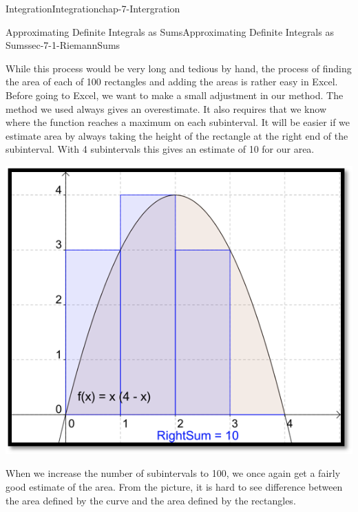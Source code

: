 \documentclass[oneside,10pt,]{book}
\numberwithin{equation}{section}
\begin{document}
\begin{chapterptx}{Integration}{}{Integration}{}{}{chap-7-Intergration}
\begin{sectionptx}{Approximating Definite Integrals as Sums}{}{Approximating Definite Integrals as Sums}{}{}{sec-7-1-RiemannSums}
\begin{sidebyside}{1}{0.2}{0.2}{0}
\begin{sbspanel}{0.6}
\end{sbspanel}%
\end{sidebyside}%
\par
\hypertarget{p-2554}{}%
While this process would be very long and tedious by hand, the process of finding the area of each of 100 rectangles and adding the areas is rather easy in Excel.  Before going to Excel, we want to make a small adjustment in our method.  The method we used always gives an overestimate.  It also requires that we know where the function reaches a maximum on each subinterval.  It will be easier if we estimate area by always taking the height of the rectangle at the right end of the subinterval.  With 4 subintervals this gives an estimate of 10 for our area.%
\begin{sidebyside}{1}{0.2}{0.2}{0}%
\begin{sbspanel}{0.6}%
\includegraphics[width=1\linewidth]{images/sec7-1-7.png}
\end{sbspanel}%
\end{sidebyside}%
\par
\hypertarget{p-2555}{}%
When we increase the number of subintervals to 100, we once again get a fairly good estimate of the area.  From the picture, it is hard to see difference between the area defined by the curve and the area defined by the rectangles.%
\begin{sidebyside}{1}{0.2}{0.2}{0}%
\begin{sbspanel}{0.6}%

\end{sbspanel}
\end{sidebyside}
\end{sectionptx}
\end{chapterptx}
\end{document}
